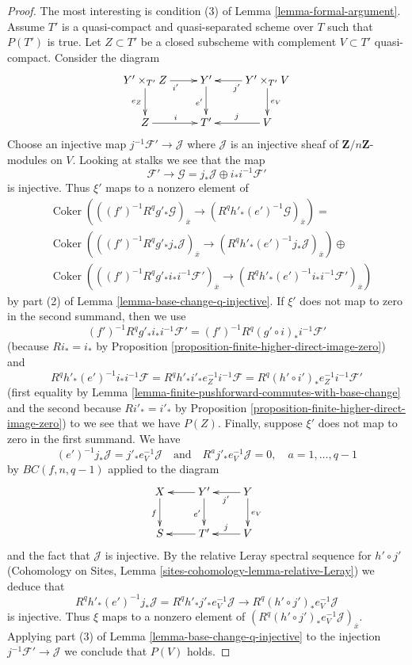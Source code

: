 \documentclass[10pt,a4paper]{amsart}
\theoremstyle{plain}
\theoremstyle{definition}
\theoremstyle{remark}
\numberwithin{equation}{subsection}
\def\Coker{\mathop{\mathrm{Coker}}}
\begin{document}
\begin{proof}
\medskip\noindent
The most interesting is condition (3) of Lemma \ref{lemma-formal-argument}.
Assume $T'$ is a quasi-compact and quasi-separated scheme over $T$
such that $P(T')$ is true.
Let $Z \subset T'$ be a closed subscheme with complement $V \subset T'$
quasi-compact. Consider the diagram
$$
\xymatrix{
Y' \times_{T'} Z \ar[d]_{e_Z} \ar[r]_{i'} &
Y' \ar[d]_{e'} &
Y' \times_{T'} V \ar[l]^{j'} \ar[d]^{e_V} \\
Z \ar[r]^i &
T' &
V \ar[l]_j
}
$$
Choose an injective map $j^{-1}\mathcal{F}' \to \mathcal{J}$
where $\mathcal{J}$ is an injective sheaf of $\mathbf{Z}/n\mathbf{Z}$-modules
on $V$. Looking at stalks we see that the map
$$
\mathcal{F}' \to \mathcal{G} = j_*\mathcal{J} \oplus i_*i^{-1}\mathcal{F}'
$$
is injective. Thus $\xi'$ maps to a nonzero element of
\begin{align*}
& \Coker\left(
((f')^{-1}R^qg'_*\mathcal{G})_{\overline{x}}
\to
(R^qh'_*(e')^{-1}\mathcal{G})_{\overline{x}}
\right) = \\
&
\Coker\left(
((f')^{-1}R^qg'_*j_*\mathcal{J})_{\overline{x}}
\to
(R^qh'_*(e')^{-1}j_*\mathcal{J})_{\overline{x}}
\right) \oplus \\
& \Coker\left(
((f')^{-1}R^qg'_*i_*i^{-1}\mathcal{F}')_{\overline{x}}
\to
(R^qh'_*(e')^{-1}i_*i^{-1}\mathcal{F}')_{\overline{x}}
\right)
\end{align*}
by part (2) of Lemma \ref{lemma-base-change-q-injective}.
If $\xi'$ does not map to zero in the second summand, then
we use
$$
(f')^{-1}R^qg'_*i_*i^{-1}\mathcal{F}' =
(f')^{-1}R^q(g' \circ i)_*i^{-1}\mathcal{F}'
$$
(because $Ri_* = i_*$ by
Proposition \ref{proposition-finite-higher-direct-image-zero}) and
$$
R^qh'_*(e')^{-1}i_*i^{-1}\mathcal{F} =
R^qh'_*i'_*e_Z^{-1}i^{-1}\mathcal{F} =
R^q(h' \circ i')_*e_Z^{-1}i^{-1}\mathcal{F}'
$$
(first equality by
Lemma \ref{lemma-finite-pushforward-commutes-with-base-change}
and the second because
$Ri'_* = i'_*$ by
Proposition \ref{proposition-finite-higher-direct-image-zero})
to we see that we have $P(Z)$.
Finally, suppose $\xi'$ does not map to zero in the first summand.
We have
$$
(e')^{-1}j_*\mathcal{J} = j'_*e_V^{-1}\mathcal{J}
\quad\text{and}\quad
R^aj'_*e_V^{-1}\mathcal{J} = 0, \quad a = 1, \ldots, q - 1
$$
by $BC(f, n, q - 1)$ applied to the diagram
$$
\xymatrix{
X \ar[d]_f & Y' \ar[l] \ar[d]_{e'} & Y \ar[l]^{j'} \ar[d]^{e_V} \\
S & T' \ar[l] & V \ar[l]_j
}
$$
and the fact that $\mathcal{J}$ is injective.
By the relative Leray spectral sequence for $h' \circ j'$
(Cohomology on Sites, Lemma \ref{sites-cohomology-lemma-relative-Leray})
we deduce that
$$
R^qh'_*(e')^{-1}j_*\mathcal{J} =
R^qh'_*j'_*e_V^{-1}\mathcal{J}
\longrightarrow
R^q(h' \circ j')_* e_V^{-1}\mathcal{J}
$$
is injective. Thus $\xi$ maps to a nonzero element of
$(R^q(h' \circ j')_* e_V^{-1}\mathcal{J})_{\overline{x}}$.
Applying part (3) of Lemma \ref{lemma-base-change-q-injective}
to the injection $j^{-1}\mathcal{F}' \to \mathcal{J}$
we conclude that $P(V)$ holds.
\end{proof}
\end{document}
